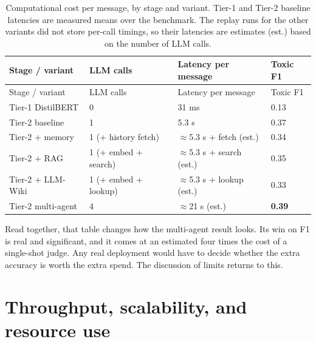 \begin{longtable}{@{}llll@{}}
\caption{Computational cost per message, by stage and variant. Tier-1 and Tier-2 baseline latencies are measured means over the benchmark. The replay runs for the other variants did not store per-call timings, so their latencies are estimates (est.) based on the number of LLM calls.}\label{tab:cost}\tabularnewline
\toprule
Stage / variant & LLM calls & Latency per message & Toxic F1 \\
\midrule
\endfirsthead
\toprule
Stage / variant & LLM calls & Latency per message & Toxic F1 \\
\midrule
\endhead
\bottomrule
\endlastfoot
Tier-1 DistilBERT & 0 & 31 ms & 0.13 \\
Tier-2 baseline & 1 & 5.3 s & 0.37 \\
Tier-2 + memory & 1 (+ history fetch) & $\approx$5.3 s + fetch (est.) & 0.34 \\
Tier-2 + RAG & 1 (+ embed + search) & $\approx$5.3 s + search (est.) & 0.35 \\
Tier-2 + LLM-Wiki & 1 (+ embed + lookup) & $\approx$5.3 s + lookup (est.) & 0.33 \\
Tier-2 multi-agent & 4 & $\approx$21 s (est.) & \textbf{0.39} \\
\end{longtable}

Read together, that table changes how the multi-agent result looks. Its win on F1 is real and significant, and it comes at an estimated four times the cost of a single-shot judge. Any real deployment would have to decide whether the extra accuracy is worth the extra spend. The discussion of limits returns to this.

\section{Throughput, scalability, and resource use}\label{throughput-scalability}


